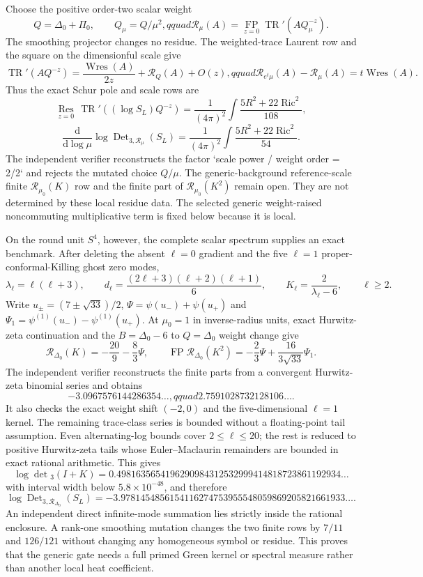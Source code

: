 \documentclass[11pt]{article}
\theoremstyle{definition}
\theoremstyle{remark}
\newcommand{\dd}{\mathrm d}
\begin{document}
Choose the positive order-two scalar weight
\[
 Q=\Delta_0+\Pi_0,\qquad Q_\mu=Q/\mu^2,qquad
 \mathcal R_\mu(A)=\underset{z=0}{\operatorname{FP}}
 \operatorname{TR}'(AQ_\mu^{-z}).
\]
The smoothing projector changes no residue.  The weighted-trace Laurent row
and the square on the dimensionful scale give
\[
 \operatorname{TR}'(AQ^{-z})
 =\frac{\operatorname{Wres}(A)}{2z}+\mathcal R_Q(A)+O(z),qquad
 \mathcal R_{e^t\mu}(A)-\mathcal R_\mu(A)=t\operatorname{Wres}(A).
\]
Thus the exact Schur pole and scale rows are
\[
 \underset{z=0}{\operatorname{Res}}\,
 \operatorname{TR}'((\log S_L)Q^{-z})
 =\frac1{(4\pi)^2}\int\frac{5R^2+22\operatorname{Ric}^2}{108},
\]
\[
 \frac{\dd}{\dd\log\mu}
 \log\operatorname{Det}_{3,\mathcal R_\mu}(S_L)
 =\frac1{(4\pi)^2}\int\frac{5R^2+22\operatorname{Ric}^2}{54}.
\]
The independent verifier reconstructs the factor
`scale power / weight order = 2/2` and rejects the mutated choice $Q/\mu$.
The generic-background reference-scale finite $\mathcal R_{\mu_0}(K)$ row
and the finite part of $\mathcal R_{\mu_0}(K^2)$ remain open.  They are not
determined by these local residue data.  The selected generic weight-raised
noncommuting multiplicative term is fixed below because it is local.

On the round unit $S^4$, however, the complete scalar spectrum supplies an
exact benchmark.  After deleting the absent $\ell=0$ gradient and the five
$\ell=1$ proper-conformal-Killing ghost zero modes,
\[
 \lambda_\ell=\ell(\ell+3),\qquad
 d_\ell=\frac{(2\ell+3)(\ell+2)(\ell+1)}6,
 \qquad K_\ell=\frac2{\lambda_\ell-6},\qquad \ell\geq2.
\]
Write $u_\pm=(7\pm\sqrt{33})/2$,
$\Psi=\psi(u_-)+\psi(u_+)$ and
$\Psi_1=\psi^{(1)}(u_-)-\psi^{(1)}(u_+)$.  At $\mu_0=1$ in inverse-radius
units, exact Hurwitz-zeta continuation and the $B=\Delta_0-6$ to
$Q=\Delta_0$ weight change give
\[
 \mathcal R_{\Delta_0}(K)=-\frac{20}{9}-\frac83\Psi,
 \qquad
 \operatorname{FP}\mathcal R_{\Delta_0}(K^2)
 =-\frac23\Psi+\frac{16}{3\sqrt{33}}\Psi_1.
\]
The independent verifier reconstructs the finite parts from a convergent
Hurwitz-zeta binomial series and obtains
\[
 -3.0967576144286354\ldots,qquad
 2.7591028732128106\ldots.
\]
It also checks the exact weight shift $(-2,0)$ and the five-dimensional
$\ell=1$ kernel.  The remaining trace-class series is bounded without a
floating-point tail assumption.  Even alternating-log bounds cover
$2\leq\ell\leq20$; the rest is reduced to positive Hurwitz-zeta tails whose
Euler--Maclaurin remainders are bounded in exact rational arithmetic.  This
gives
\[
 \log\det{}_3(I+K)
 =0.4981635654196290984312532999414818723861192934\ldots
\]
with interval width below $5.8\times10^{-48}$, and therefore
\[
 \log\operatorname{Det}_{3,\mathcal R_{\Delta_0}}(S_L)
 =-3.9781454856154116274753955548059869205821661933\ldots.
\]
An independent direct infinite-mode summation lies strictly inside the
rational enclosure.  A rank-one smoothing mutation changes the two finite rows
by $7/11$ and $126/121$ without changing any homogeneous symbol or residue.
This proves that the generic gate needs a full primed Green kernel or
spectral measure rather than another local heat coefficient.
\end{document}
